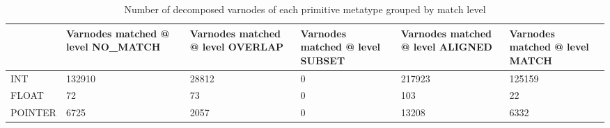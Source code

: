 \begin{table}[t]
\centering
\caption{Number of decomposed varnodes of each primitive metatype grouped by match level}
\label{table:metatype-match-levels-decomposed}
\begin{tabular}{lp{3.6cm}p{3.6cm}p{3.6cm}p{3.6cm}p{3.6cm}}
\toprule
{} &  Varnodes matched @ level NO\_MATCH &  Varnodes matched @ level OVERLAP &  Varnodes matched @ level SUBSET &  Varnodes matched @ level ALIGNED &  Varnodes matched @ level MATCH \\
\midrule
INT     &                             132910 &                             28812 &                                0 &                            217923 &                          125159 \\
FLOAT   &                                 72 &                                73 &                                0 &                               103 &                              22 \\
POINTER &                               6725 &                              2057 &                                0 &                             13208 &                            6332 \\
\bottomrule
\end{tabular}
\end{table}
